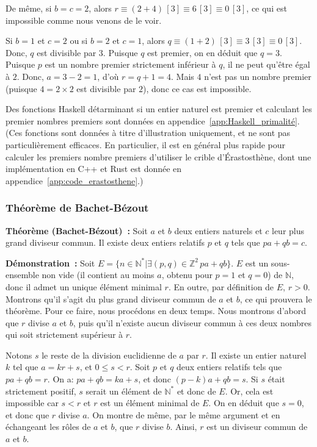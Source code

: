 De même, si $b = c = 2$, alors $r \equiv (2 + 4) \, [3] \equiv 6 \, [3] \equiv 0 \, [3]$, ce qui est impossible comme nous venons de le voir.

Si $b = 1$ et $c = 2$ ou si $b = 2$ et $c = 1$, alors $q \equiv (1 + 2) \, [3] \equiv 3 \, [3] \equiv 0 \, [3]$. 
Donc, $q$ est divisible par $3$.
Puisque $q$ est premier, on en déduit que $q=3$. 
Puisque $p$ est un nombre premier strictement inférieur à $q$, il ne peut qu'être égal à $2$. 
Donc, $a = 3-2 = 1$, d'où $r = q + 1 = 4$. 
Mais $4$ n'est pas un nombre premier (puisque $4 = 2 \times 2$ est divisible par $2$), donc ce cas est impossible.

\done

\bigskip

Des fonctions Haskell détarminant si un entier naturel est premier et calculant les premier nombres premiers sont données en appendice~\ref{app:Haskell_primalité}. 
(Ces fonctions sont données à titre d'illustration uniquement, et ne sont pas particulièrement efficaces. 
En particulier, il est en général plus rapide pour calculer les premiers nombre premiers d'utiliser le crible d'Érastosthène, dont une implémentation en C++ et Rust est donnée en appendice~\ref{app:code_erastosthene}.)

\subsubsection{Théorème de Bachet-Bézout}

\bigskip

\noindent\textbf{Théorème (Bachet-Bézout) :} 
Soit $a$ et $b$ deux entiers naturels et $c$ leur plus grand diviseur commun. 
Il existe deux entiers relatifs $p$ et $q$ tels que $p a + q b = c$. 

\medskip

\noindent\textbf{Démonstration :} 
Soit $E = \lbrace n \in \mathbb{N}^* \vert \exists (p,q) \in \mathbb{Z}^2 \, p a + q b \rbrace$. 
$E$ est un sous-ensemble non vide (il contient au moins $a$, obtenu pour $p=1$ et $q=0$) de $\mathbb{N}$, donc il admet un unique élément minimal $r$. 
En outre, par définition de $E$, $r > 0$. 
Montrons qu'il s'agit du plus grand diviseur commun de $a$ et $b$, ce qui prouvera le théorème. 
Pour ce faire, nous procédons en deux temps. 
Nous montrons d'abord que $r$ divise $a$ et $b$, puis qu'il n'existe aucun diviseur commun à ces deux nombres qui soit strictement supérieur à $r$.

Notons $s$ le reste de la division euclidienne de $a$ par $r$. 
Il existe un entier naturel $k$ tel que $a = k r + s$, et $0 \leq s < r$. 
Soit $p$ et $q$ deux entiers relatifs tels que $p a + q b = r$. 
On a: $p a + q b = k a + s$, et donc $(p-k) a + q b = s$. 
Si $s$ était strictement positif, $s$ serait un élément de $\mathbb{N}^*$ et donc de $E$. 
Or, cela est impossible car $s < r$ et $r$ est un élément minimal de $E$. 
On en déduit que $s = 0$, et donc que $r$ divise $a$. 
On montre de même, par le même argument et en échangeant les rôles de $a$ et $b$, que $r$ divise $b$. 
Ainsi, $r$ est un diviseur commun de $a$ et $b$. 

